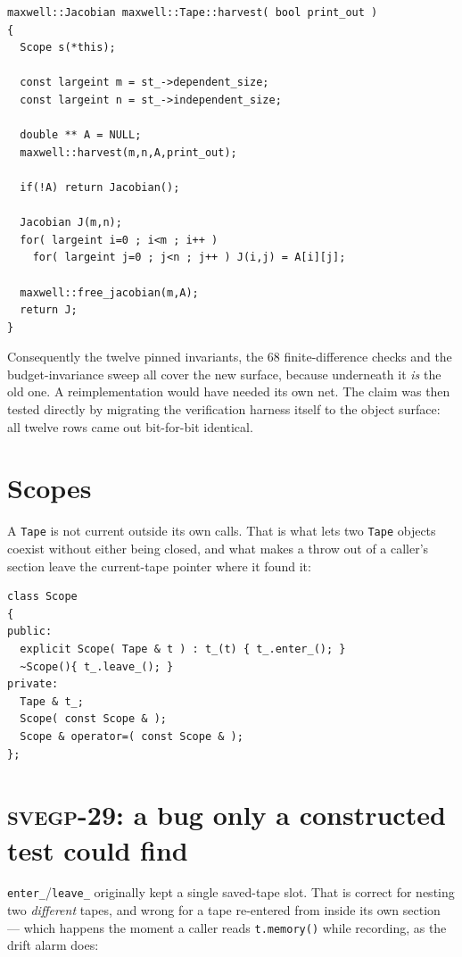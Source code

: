 \documentclass[11pt,a4paper]{report}
\newcommand{\svegp}[1]{\textsc{svegp-#1}}
\newcommand{\code}[1]{\texttt{#1}}
\begin{document}
\begin{lstlisting}
maxwell::Jacobian maxwell::Tape::harvest( bool print_out )
{
  Scope s(*this);

  const largeint m = st_->dependent_size;
  const largeint n = st_->independent_size;

  double ** A = NULL;
  maxwell::harvest(m,n,A,print_out);

  if(!A) return Jacobian();

  Jacobian J(m,n);
  for( largeint i=0 ; i<m ; i++ )
    for( largeint j=0 ; j<n ; j++ ) J(i,j) = A[i][j];

  maxwell::free_jacobian(m,A);
  return J;
}
\end{lstlisting}

Consequently the twelve pinned invariants, the 68 finite-difference checks and
the budget-invariance sweep all cover the new surface, because underneath it
\emph{is} the old one. A reimplementation would have needed its own net. The
claim was then tested directly by migrating the verification harness itself to
the object surface: all twelve rows came out bit-for-bit identical.

\section{Scopes}

A \code{Tape} is not current outside its own calls. That is what lets two
\code{Tape} objects coexist without either being closed, and what makes a throw
out of a caller's section leave the current-tape pointer where it found it:

\begin{lstlisting}
class Scope
{
public:
  explicit Scope( Tape & t ) : t_(t) { t_.enter_(); }
  ~Scope(){ t_.leave_(); }
private:
  Tape & t_;
  Scope( const Scope & );
  Scope & operator=( const Scope & );
};
\end{lstlisting}

\section{\svegp{29}: a bug only a constructed test could find}

\code{enter\_}/\code{leave\_} originally kept a single saved-tape slot. That is
correct for nesting two \emph{different} tapes, and wrong for a tape re-entered
from inside its own section --- which happens the moment a caller reads
\code{t.memory()} while recording, as the drift alarm does:
\end{document}
